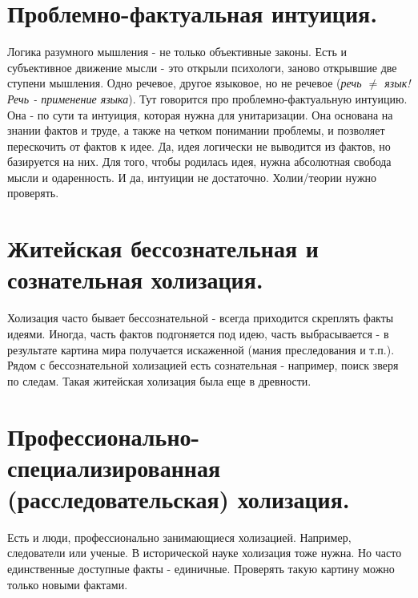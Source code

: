 \section{ Проблемно-фактуальная интуиция.}
Логика разумного мышления - не только объективные законы. Есть и субъективное движение мысли - это открыли психологи, заново открывшие две ступени мышления. Одно речевое, другое языковое, но не речевое (\textit{речь $\ne$ язык! Речь - применение языка}). Тут говорится про проблемно-фактуальную интуицию. Она - по сути та интуиция, которая нужна для унитаризации. Она основана на знании фактов и труде, а также на четком понимании проблемы, и позволяет перескочить от фактов к идее. Да, идея логически не выводится из фактов, но базируется на них. Для того, чтобы родилась идея, нужна абсолютная свобода мысли и одаренность. И да, интуиции не достаточно. Холии/теории нужно проверять.

\section{ Житейская бессознательная и сознательная холизация. }
Холизация часто бывает бессознательной - всегда приходится скреплять факты идеями. Иногда, часть фактов подгоняется под идею, часть выбрасывается - в результате картина мира получается искаженной (мания преследования и т.п.). Рядом с бессознательной холизацией есть сознательная - например, поиск зверя по следам. Такая житейская холизация была еще в древности.

\section{ Профессионально-специализированная (расследовательская) холизация.}
Есть и люди, профессионально занимающиеся холизацией. Например, следователи или ученые.
В исторической науке холизация тоже нужна. Но часто единственные доступные факты - единичные. Проверять такую картину можно только новыми фактами.

